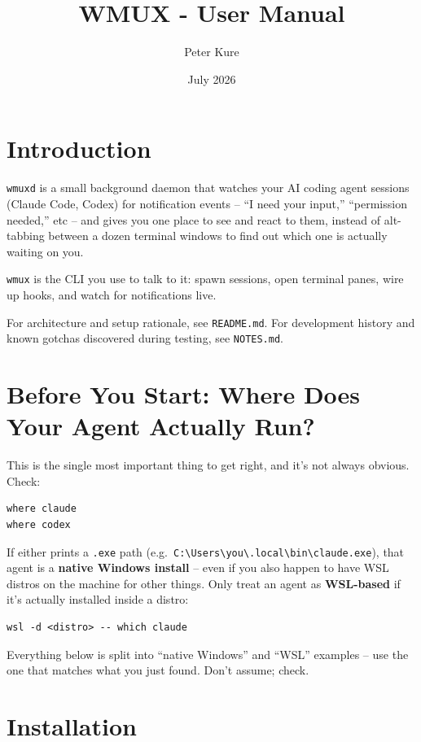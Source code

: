 \documentclass{article}
\title{WMUX - User Manual}
\author{Peter Kure}
\date{July 2026}
\begin{document}
\maketitle

\section{Introduction}

\texttt{wmuxd} is a small background daemon that watches your AI coding agent sessions (Claude Code, Codex) for notification events -- ``I need your input,'' ``permission needed,'' etc -- and gives you one place to see and react to them, instead of alt-tabbing between a dozen terminal windows to find out which one is actually waiting on you.

\texttt{wmux} is the CLI you use to talk to it: spawn sessions, open terminal panes, wire up hooks, and watch for notifications live.

For architecture and setup rationale, see \texttt{README.md}. For development history and known gotchas discovered during testing, see \texttt{NOTES.md}.

\section{Before You Start: Where Does Your Agent Actually Run?}

This is the single most important thing to get right, and it's not always obvious. Check:

\begin{lstlisting}
where claude
where codex
\end{lstlisting}

If either prints a \texttt{.exe} path (e.g.\ \texttt{C:\textbackslash Users\textbackslash you\textbackslash .local\textbackslash bin\textbackslash claude.exe}), that agent is a \textbf{native Windows install} -- even if you also happen to have WSL distros on the machine for other things. Only treat an agent as \textbf{WSL-based} if it's actually installed inside a distro:

\begin{lstlisting}
wsl -d <distro> -- which claude
\end{lstlisting}

Everything below is split into ``native Windows'' and ``WSL'' examples -- use the one that matches what you just found. Don't assume; check.

\section{Installation}
\end{document}
